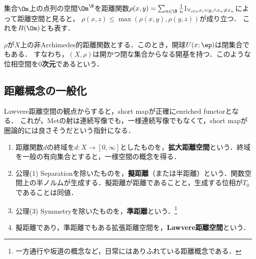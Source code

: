 \documentclass[uplatex,dvipdfmx]{jsreport}
\begin{document}
\begin{example}[Baireの(0次元)空間]\label{exp-Baire-space}
    集合$\Om$上の点列の空間$\Om^\N$を距離関数$\rho(x,y)=\sum_{n\in\N}\frac{1}{n}1_{\forall_{i\in n}x_i=y_i\land x_n\ne x_n}$によって距離空間と見ると，
    $\rho(x,z)\le\max(\rho(x,y),\rho(y,z))$が成り立つ．
    これを$B(\Om)$とも表す．
\end{example}

\begin{proposition}[非Archimedesな距離空間の開球は閉]
    $\rho$が$X$上の非Archimedes的距離関数とする．このとき，開球$U(x;\ep)$は閉集合でもある．
    すなわち，$(X,\rho)$は開かつ閉な集合からなる開基を持つ．このような位相空間を\textbf{$0$次元}であるという．
\end{proposition}

\subsection{距離概念の一般化}

\begin{tcolorbox}[colframe=ForestGreen, colback=ForestGreen!10!white,breakable,colbacktitle=ForestGreen!40!white,coltitle=black,fonttitle=\bfseries\sffamily,
    title=]
        Lawvere距離空間の観点からすると，short mapが正確にenriched functorとなる．
        これが，Metの射は連続写像でも，一様連続写像でもなくて，short mapが圏論的には良さそうだという指針になる．
\end{tcolorbox}

\begin{definition}\mbox{}
    \begin{enumerate}
        \item 距離関数$d$の終域を$d:X\to[0,\infty]$としたものを，\textbf{拡大距離空間}という．終域を一般の有向集合とすると，一様空間の概念を得る．
        \item 公理(1) Separationを除いたものを，\textbf{擬距離}（または半距離）という．関数空間上の半ノルムが生成する．擬距離が距離であることと，生成する位相が$T_0$であることは同値．
        \item 公理(3) Symmetryを除いたものを，\textbf{準距離}という．\footnote{一方通行や坂道の概念など，日常にはありふれている距離概念である．}
        \item 擬距離であり，準距離でもある拡張距離空間を，\textbf{Lawvere距離空間}という．
    \end{enumerate}
\end{definition}
\end{document}
